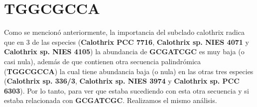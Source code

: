 \documentclass[
]{book}
\begin{document}
\hypertarget{tggcgcca}{%
\section{TGGCGCCA}\label{tggcgcca}}

Como se mencionó anteriormente, la importancia del subclado calothrix radica que en 3 de las especies (\textbf{Calothrix PCC 7716}, \textbf{Calothrix sp. NIES 4071} y \textbf{Calothrix sp. NIES 4105}) la abundancia de \textbf{GCGATCGC} es muy baja (o casi nula), además de que contienen otra secuencia palindrómica (\textbf{TGGCGCCA}) la cual tiene abundancia baja (o nula) en las otras tres especies (\textbf{Calothrix sp. 336/3}, \textbf{Calothrix sp. NIES 3974} y \textbf{Calothrix sp. PCC 6303}). Por lo tanto, para ver que estaba sucediendo con esta otra secuencia y si estaba relacionada con \textbf{GCGATCGC}. Realizamos el mismo análisis.

  
\end{document}
